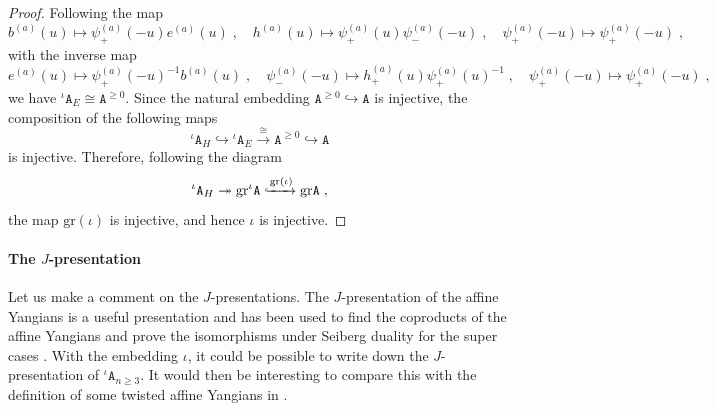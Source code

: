 \documentclass[11pt]{article}
\numberwithin{equation}{section}
\numberwithin{figure}{section}
\numberwithin{table}{section}
\begin{document}
\begin{proof}
	Following the map
	\begin{equation}
		b^{(a)}(u)\mapsto\psi_+^{(a)}(-u)e^{(a)}(u)\;,\quad h^{(a)}(u)\mapsto\psi_+^{(a)}(u)\psi_-^{(a)}(-u)\;,\quad\psi_+^{(a)}(-u)\mapsto\psi_+^{(a)}(-u)\;,
	\end{equation}
	with the inverse map
	\begin{equation}
		e^{(a)}(u)\mapsto\psi_+^{(a)}(-u)^{-1}b^{(a)}(u)\;,\quad\psi_-^{(a)}(-u)\mapsto h^{(a)}_+(u)\psi_+^{(a)}(u)^{-1}\;,\quad\psi_+^{(a)}(-u)\mapsto\psi_+^{(a)}(-u)\;,
	\end{equation}
	we have ${}^\iota\mathtt{A}_E\cong\mathtt{A}^{\geq0}$. Since the natural embedding $\mathtt{A}^{\geq0}\hookrightarrow\mathtt{A}$ is injective, the composition of the following maps
	\begin{equation}
		{}^\iota\mathtt{A}_H\hookrightarrow{}^\iota\mathtt{A}_E\xrightarrow{\cong}\mathtt{A}^{\geq0}\hookrightarrow\mathtt{A}
	\end{equation}
	is injective. Therefore, following the diagram
	\begin{equation}
		{}^\iota\mathtt{A}_H\twoheadrightarrow\mathrm{gr}{}^\iota\mathtt{A}\xhookrightarrow{\mathrm{gr}(\iota)}\mathrm{gr}\mathtt{A}\;,
	\end{equation}
	the map $\mathrm{gr}(\iota)$ is injective, and hence $\iota$ is injective.
\end{proof}

\paragraph{The \texorpdfstring{$J$-presentation}{J-presentation}} Let us make a comment on the $J$-presentations. The $J$-presentation of the affine Yangians is a useful presentation and has been used to find the coproducts of the affine Yangians \cite{guay2018coproduct,ueda2023construction} and prove the isomorphisms under Seiberg duality for the super cases \cite{Bao:2022jhy}. With the embedding $\iota$, it could be possible to write down the $J$-presentation of ${}^\iota\mathtt{A}_{n\geq3}$. It would then be interesting to compare this with the definition of some twisted affine Yangians in \cite{ueda2025twisted,harako2026new}.
\end{document}
